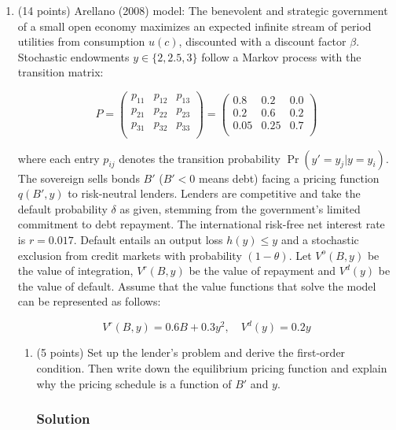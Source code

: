 \documentclass[12pt]{article}
\begin{document}
\begin{enumerate}
\begin{enumerate}[label=(\alph*)]
    \end{enumerate}

    \item (14 points) {Arellano (2008) model:} The benevolent and strategic government of a small open economy maximizes an expected infinite stream of period utilities from consumption $u(c)$, discounted with a discount factor $\beta$. Stochastic endowments $y \in \{2, 2.5, 3\}$ follow a Markov process with the transition matrix:

    \[
    P = \begin{pmatrix}
    p_{11} & p_{12} & p_{13} \\
    p_{21} & p_{22} & p_{23} \\
    p_{31} & p_{32} & p_{33} \\
    \end{pmatrix}
    = \begin{pmatrix}
    0.8 & 0.2 & 0.0 \\
    0.2 & 0.6 & 0.2 \\
    0.05 & 0.25 & 0.7 \\
    \end{pmatrix}
    \]

    where each entry $p_{ij}$ denotes the transition probability $\Pr(y' = y_j | y = y_i)$. The sovereign sells bonds $B'$ ($B' < 0$ means debt) facing a pricing function $q(B', y)$ to risk-neutral lenders. Lenders are competitive and take the default probability $\delta$ as given, stemming from the government’s limited commitment to debt repayment. The international risk-free net interest rate is $r = 0.017$. Default entails an output loss $h(y) \leq y$ and a stochastic exclusion from credit markets with probability $(1 - \theta)$. Let $V^o(B, y)$ be the value of integration, $V^r(B, y)$ be the value of repayment and $V^d(y)$ be the value of default. Assume that the value functions that solve the model can be represented as follows:

    \[
    V^r(B, y) = 0.6B + 0.3y^2, \quad V^d(y) = 0.2y
    \]

    \begin{enumerate}[label=(\alph*)]
        \item (5 points) Set up the lender’s problem and derive the first-order condition. Then write down the equilibrium pricing function and explain why the pricing schedule is a function of $B'$ and $y$.
        \subsubsection*{Solution}
        

\end{enumerate}
\end{enumerate}
\end{document}
